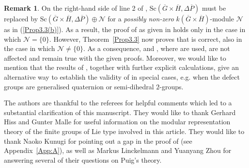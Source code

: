 \documentclass[12pt,a4paper]{amsart}
\theoremstyle{plain}\newtheorem{Theorem}{Theorem}[section]
\theoremstyle{plain}\newtheorem{Conjecture}[Theorem]{Conjecture}
\theoremstyle{plain}\newtheorem{Corollary}[Theorem]{Corollary}
\theoremstyle{plain}\newtheorem{Lemma}[Theorem]{Lemma}
\theoremstyle{plain}\newtheorem{Proposition}[Theorem]{Proposition}
\theoremstyle{definition}\newtheorem{Definition}[Theorem]{Definition}
\theoremstyle{definition}\newtheorem{Example}[Theorem]{Example}
\theoremstyle{definition}\newtheorem{Examples}[Theorem]{Examples}
\theoremstyle{definition}\newtheorem{Remark}[Theorem]{Remark}
\theoremstyle{definition}\newtheorem{Question}[Theorem]{Question}
\theoremstyle{definition}\newtheorem{Notation}[Theorem]{Notation}
\theoremstyle{definition}\newtheorem{Hypothesis}[Theorem]{Hypothesis}
\theoremstyle{definition}\newtheorem{Assumption}[Theorem]{Assumption}
\theoremstyle{definition}\newtheorem{Strategy}[Theorem]{Strategy}
\theoremstyle{definition}\newtheorem{Contents}[Theorem]{Contents}
\theoremstyle{definition}\newtheorem{Computations}[Theorem]{Computations}
\theoremstyle{definition}\newtheorem{Equivalences}[Theorem]{Equivalences}
\theoremstyle{definition}\newtheorem{Notation/Definition}[Theorem]{Notation/Definition}
\theoremstyle{definition}\newtheorem{noth}[Theorem]{}
\theoremstyle{plain}\newtheorem{Step}[Theorem]{Step}
\newcommand{\Sc}{{\text{Sc}}}
\begin{document}
\begin{Remark}\label{Rem4.4}
On the right-hand side of line 2 of \cite[Lemma~3.1(b)]{KL20b},
$\Sc(\overline G\times\overline H, \Delta\overline P)$ must be replaced by
$\Sc(\overline G\times\overline H, \Delta\overline P)\oplus\mathcal N$ for a
{\it possibly non-zero} $k(\overline G\times\overline H)$-module $\mathcal N$
as  in (\ref{Prop3.3(b)}).
As a result, the proof of \cite[Proposition 3.3(b)]{KL20b} as given in \cite{KL20b}  
holds only in the case in which $\mathcal{N}=\{0\}$. 
However, Theorem~\ref{Prop3.3} now proves that 
 \cite[Proposition~3.3(b)]{KL20b} is correct, also in the case in which $\mathcal{N}\neq\{0\}$.
As a consequence, \cite{KL20b} and \cite[proof of Proposition 5.2]{KLS20}, where
\cite[Proposition 3.3(b)]{KL20b} are used, are not affected and remain true with the given proofs.
Moreover, we would like to mention that the results of \cite{KS23}, 
together with further explicit calculations, give an alternative way to establish
the validity of \cite[Proposition~3.3(b)]{KL20b} 
in special cases, e.g. when the defect groups are generalised quaternion or semi-dihedral $2$-groups.
\end{Remark}




\vspace{4mm}
{\small 
The authors are thankful to the referees for helpful comments which led to a substantial 
clarification of this manuscript. They would like to thank 
Gerhard Hiss and Gunter Malle for useful information on the modular representation 
theory of the finite groups of Lie type involved in this article.
They would  like to thank  Naoko Kunugi
for pointing out a gap in the proof of \cite[Proposition~3.3(b)]{KL20b}
(see Appendix~\ref{App:A}), as well as Markus Linckelmann and Yuanyang Zhou
for answering several of their questions on Puig's theory.}
\end{document}
